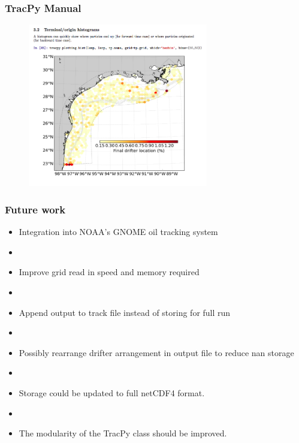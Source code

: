 \documentclass[ignorenonframetext]{beamer}
\begin{document}
\begin{frame}[t,noframenumbering]\frametitle{TracPy Manual}
	\begin{figure}[htbp]
		\centering
		\includegraphics[width=0.7\textwidth]{figures/manual7}
	\end{figure}
\end{frame}

\begin{frame}[t]\frametitle{Future work}
\begin{itemize}
	\item {\Large Integration into NOAA's GNOME oil tracking system}
	\item[] ~
	\item {\Large Improve grid read in speed and memory required}
	\item[] ~
	\item {\Large Append output to track file instead of storing for full run}
	\item[] ~
	\item {\Large Possibly rearrange drifter arrangement in output file to reduce nan storage}
	\item[] ~
	\item {\Large Storage could be updated to full netCDF4 format.}
	\item[] ~
	\item {\Large The modularity of the TracPy class should be improved.}
\end{itemize}
\end{frame}
\end{document}
